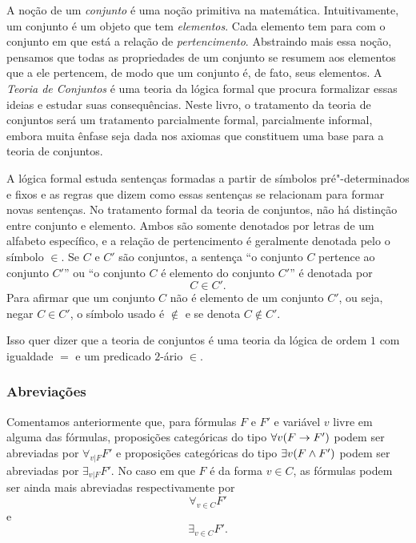A noção de um \emph{conjunto} é uma noção primitiva na matemática. Intuitivamente, um conjunto é um objeto que tem \emph{elementos}. Cada elemento tem para com o conjunto em que está a relação de \emph{pertencimento}. Abstraindo mais essa noção, pensamos que todas as propriedades de um conjunto se resumem aos elementos que a ele pertencem, de modo que um conjunto é, de fato, seus elementos. A \emph{Teoria de Conjuntos} é uma teoria da lógica formal que procura formalizar essas ideias e estudar suas consequências. Neste livro, o tratamento da teoria de conjuntos será um tratamento parcialmente formal, parcialmente informal, embora muita ênfase seja dada nos axiomas que constituem uma base para a teoria de conjuntos.

A lógica formal estuda sentenças formadas a partir de símbolos pré"-determinados e fixos e as regras que dizem como essas sentenças se relacionam para formar novas sentenças. No tratamento formal da teoria de conjuntos, não há distinção entre conjunto e elemento. Ambos são somente denotados por letras de um alfabeto específico, e a relação de pertencimento é geralmente denotada pelo o símbolo $\in$. Se $C$ e $C'$ são conjuntos, a sentença ``o conjunto $C$ pertence ao conjunto $C'$'' ou ``o conjunto $C$ é elemento do conjunto $C'$'' é denotada por
	\begin{equation*}
	C \in C'.
	\end{equation*}
Para afirmar que um conjunto $C$ não é elemento de um conjunto $C'$, ou seja, negar $C \in C'$, o símbolo usado é $\notin$ e se denota $C \notin C'$.

Isso quer dizer que a teoria de conjuntos é uma teoria da lógica de ordem $1$ com igualdade $=$ e um predicado $2$-ário $\in$.

\subsubsection{Abreviações}

Comentamos anteriormente que, para fórmulas $F$ e $F'$ e variável $v$ livre em alguma das fórmulas, proposições categóricas do tipo $\forall v(F \rightarrow F')$ podem ser abreviadas por $\forall_{v | F} F'$ e proposições categóricas do tipo $\exists v(F \land F')$ podem ser abreviadas por $\exists_{v | F} F'$. No caso em que $F$ é da forma $v \in C$, as fórmulas podem ser ainda mais abreviadas respectivamente por
	\begin{equation*}
	\forall_{v \in C} F'
	\end{equation*}
e
	\begin{equation*}
	\exists_{v \in C} F'.
	\end{equation*}

